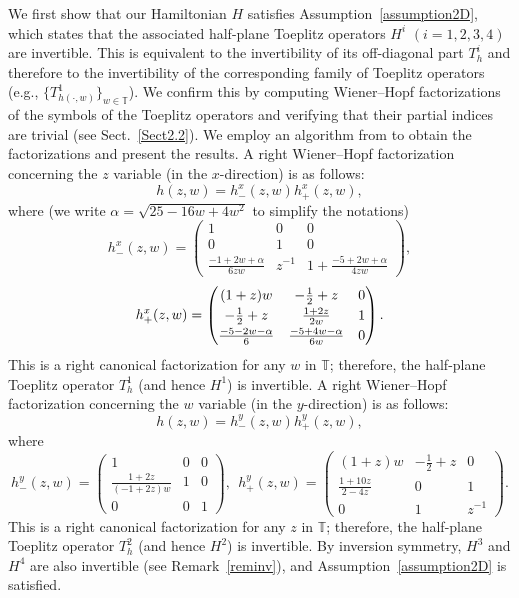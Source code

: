 \documentclass{amsart}
\theoremstyle{plain}
\theoremstyle{definition}
\theoremstyle{remark}
\newcommand{\T}{\mathbb{T}}
\begin{document}
We first show that our Hamiltonian $H$ satisfies Assumption~\ref{assumption2D}, which states that the associated half-plane Toeplitz operators $H^i$ $(i=1,2,3,4)$ are invertible.
This is equivalent to the invertibility of its off-diagonal part $T^i_{h}$ and therefore to the invertibility of the corresponding family of Toeplitz operators (e.g., $\{T^1_{h(\cdot,w)}\}_{w \in \T}$).
We confirm this by computing Wiener--Hopf factorizations of the symbols of the Toeplitz operators and verifying that their partial indices are trivial (see Sect.~\ref{Sect2.2}).
We employ an algorithm from \cite{GKS03} to obtain the factorizations and present the results.
A right Wiener--Hopf factorization concerning the $z$ variable (in the $x$-direction) is as follows:
$$h(z,w) = h^x_-(z,w) h^x_+(z,w),$$
where (we write $\alpha = \sqrt{25-16w+4w^2}$ to simplify the notations)
\begin{equation*}
	h^x_-(z,w) =
\begin{pmatrix}
1 & 0 & 0\\
0 & 1 & 0\\
\frac{-1+2w+\alpha}{6zw} & z^{-1} & 1 + \frac{-5+2w+\alpha}{4zw}
\end{pmatrix},
\end{equation*}
\begin{equation*}
	h^x_+(z,w) =
{\renewcommand{\arraystretch}{1.2}
\begin{pmatrix}
(1+z)w & -\frac{1}{2}+z & 0\\
-\frac{1}{2}+z & \frac{1+2z}{2w} & 1\\
\frac{-5-2w-\alpha}{6} & \frac{-5+4w-\alpha}{6w} & 0
\end{pmatrix}.}
\end{equation*}
This is a right canonical factorization for any $w$ in $\T$; therefore, the half-plane Toeplitz operator $T_h^1$ (and hence $H^1$) is invertible.
A right Wiener--Hopf factorization concerning the $w$ variable (in the $y$-direction) is as follows:
$$h(z,w) = h^y_-(z,w) h^y_+(z,w),$$
where
\begin{equation*}
	h^y_-(z,w) =
\begin{pmatrix}
1 & 0 & 0\\
\frac{1+2z}{(-1+2z)w} & 1 & 0\\
0 & 0 & 1
\end{pmatrix},
\ \
	h^y_+(z,w) =
\begin{pmatrix}
(1+z)w & -\frac{1}{2}+z & 0\\
\frac{1+10z}{2-4z} & 0 & 1\\
0 & 1 & z^{-1}
\end{pmatrix}.
\end{equation*}
This is a right canonical factorization for any $z$ in $\T$; therefore, the half-plane Toeplitz operator $T_h^2$ (and hence $H^2$) is invertible.
By inversion symmetry, $H^3$ and $H^4$ are also invertible (see Remark~\ref{reminv}), and Assumption~\ref{assumption2D} is satisfied.
\end{document}
